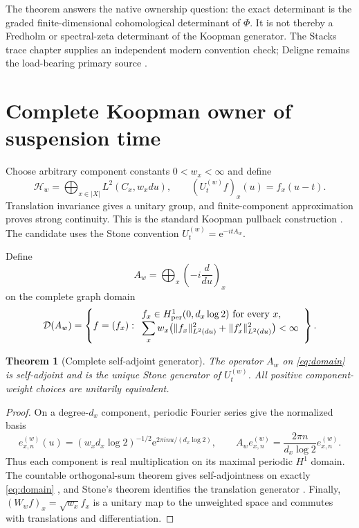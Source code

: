 \documentclass[11pt]{article}
\newtheorem{theorem}{Theorem}
\theoremstyle{remark}\newtheorem{remark}[theorem]{Remark}
\newcommand{\Hh}{\mathcal H}
\newcommand{\D}{\mathcal D}
\newcommand{\e}{\mathrm e}
\begin{document}
The theorem answers the native ownership question: the exact determinant is
the graded finite-dimensional cohomological determinant of \(\Phi\).  It is
not thereby a Fredholm or spectral-zeta determinant of the Koopman generator.
The Stacks trace chapter supplies an independent modern convention check;
Deligne remains the load-bearing primary source \citep{StacksTrace2026}.

\section{Complete Koopman owner of suspension time}

Choose arbitrary component constants \(0<w_x<\infty\) and define
\[
 \Hh_w=\bigoplus_{x\in|X|}L^2(C_x,w_xdu),\qquad
 (U_t^{(w)}f)_x(u)=f_x(u-t).
\]
Translation invariance gives a unitary group, and finite-component
approximation proves strong continuity.  This is the standard Koopman
pullback construction \citep{TerElstLemanczyk2017}.  The candidate uses the
Stone convention \(U_t^{(w)}=\e^{-itA_w}\).

Define
\[
 A_w=\bigoplus_x\left(-i\frac d{du}\right)_x
\]
on the complete graph domain
\begin{equation}
 \D(A_w)=\left\{f=(f_x):
 \begin{array}{l}
 f_x\in H^1_{\rm per}(0,d_x\log2)\text{ for every }x,\\
 \displaystyle\sum_xw_x\bigl(\|f_x\|_{L^2(du)}^2+
                   \|f_x'\|_{L^2(du)}^2\bigr)<\infty
 \end{array}\right\}.
 \label{eq:domain}
\end{equation}

\begin{theorem}[Complete self-adjoint generator]\label{thm:selfadjoint}
The operator \(A_w\) on \eqref{eq:domain} is self-adjoint and is the unique
Stone generator of \(U_t^{(w)}\).  All positive component-weight choices are
unitarily equivalent.
\end{theorem}
\begin{proof}
On a degree-\(d_x\) component, periodic Fourier series give the normalized
basis
\[
 e_{x,n}^{(w)}(u)=(w_xd_x\log2)^{-1/2}
   \e^{2\pi inu/(d_x\log2)},\qquad
 A_we_{x,n}^{(w)}=\frac{2\pi n}{d_x\log2}e_{x,n}^{(w)}.
\]
Thus each component is real multiplication on its maximal periodic
\(H^1\) domain.  The countable orthogonal-sum theorem gives self-adjointness
on exactly \eqref{eq:domain} \citep[Thm.~2.23]{Teschl2009}, and Stone's
theorem identifies the translation generator \citep[Thms.~5.1--5.2]{Teschl2009}.
Finally, \((W_wf)_x=\sqrt{w_x}f_x\) is a unitary map to the unweighted
space and commutes with translations and differentiation.
\end{proof}
\end{document}
